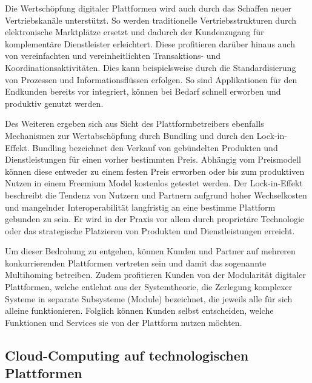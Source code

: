 Die Wertschöpfung digitaler Plattformen wird auch durch das Schaffen neuer Vertriebskanäle unterstützt. So werden traditionelle Vertriebsstrukturen durch elektronische Marktplätze ersetzt und dadurch der Kundenzugang für komplementäre Dienstleister erleichtert. Diese profitieren darüber hinaus auch von vereinfachten und vereinheitlichten Transaktions- und Koordinationsaktivitäten. Dies kann beispielsweise durch die Standardisierung von Prozessen und Informationsflüssen erfolgen. So sind Applikationen für den Endkunden bereits vor integriert, können bei Bedarf schnell erworben und produktiv genutzt werden.\autocite[Vgl.][S. 599f.]{HAHN2016}

Des Weiteren ergeben sich aus Sicht des Plattformbetreibers ebenfalls Mechanismen zur Wertabschöpfung durch Bundling und durch den Lock-in-Effekt. Bundling bezeichnet den Verkauf von gebündelten Produkten und Dienstleistungen für einen vorher bestimmten Preis. Abhängig vom Preismodell können diese entweder zu einem festen Preis erworben oder bis zum produktiven Nutzen in einem Freemium Model kostenlos getestet werden.\autocite[Vgl.][S. 178-185]{TEECE2010} Der Lock-in-Effekt beschreibt die Tendenz von Nutzern und Partnern aufgrund hoher Wechselkosten und mangelnder Interoperabilität langfristig an eine bestimme Plattform gebunden zu sein. \autocite[Vgl.][S. 22]{STEUR2022} Er wird in der Praxis vor allem durch proprietäre Technologie oder das strategische Platzieren von Produkten und Dienstleistungen erreicht. \autocite[Vgl.][S. 704]{BALLON2011}

Um dieser Bedrohung zu entgehen, können Kunden und Partner auf mehreren konkurrierenden Plattformen vertreten sein und damit das sogenannte Multihoming betreiben. \autocite[Vgl.][S. 461ff]{CENNAMO2018} Zudem profitieren Kunden von der Modularität digitaler Plattformen, welche entlehnt aus der Systemtheorie, die Zerlegung komplexer Systeme in separate Subsysteme (Module) bezeichnet, die jeweils alle für sich alleine funktionieren. \autocite[Vgl.][S. 2]{LECHNER2019} Folglich können Kunden selbst entscheiden, welche Funktionen und Services sie von der Plattform nutzen möchten.


\subsection{Cloud-Computing auf technologischen Plattformen}\label{sec:TechPCloud}


